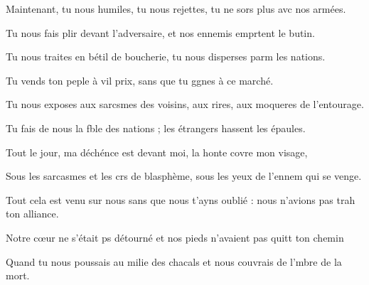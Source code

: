 \item Maintenant, tu nous humiles, tu nous rejettes,\psstar{} tu ne sors plus avc nos armées.
\item Tu nous fais plir devant l’adversaire,\psstar{} et nos ennemis emprtent le butin.
\item Tu nous traites en bétil de boucherie,\psstar{} tu nous disperses parm les nations.
\item Tu vends ton peple à vil prix,\psstar{} sans que tu ggnes à ce marché.
\item Tu nous exposes aux sarcsmes des voisins,\psstar{} aux rires, aux moqueres de l’entourage.
\item Tu fais de nous la fble des nations ;\psstar{} les étrangers hassent les épaules.
\item Tout le jour, ma déchénce est devant moi,\psstar{} la honte covre mon visage,
\item Sous les sarcasmes et les crs de blasphème,\psstar{} sous les yeux de l’ennem qui se venge.
\item Tout cela est venu sur nous sans que nous t’ayns oublié :\psstar{} nous n’avions pas trah ton alliance.
\item Notre cœur ne s’était ps détourné\psstar{} et nos pieds n’avaient pas quitt ton chemin
\item Quand tu nous poussais au milie des chacals\psstar{} et nous couvrais de l’mbre de la mort.